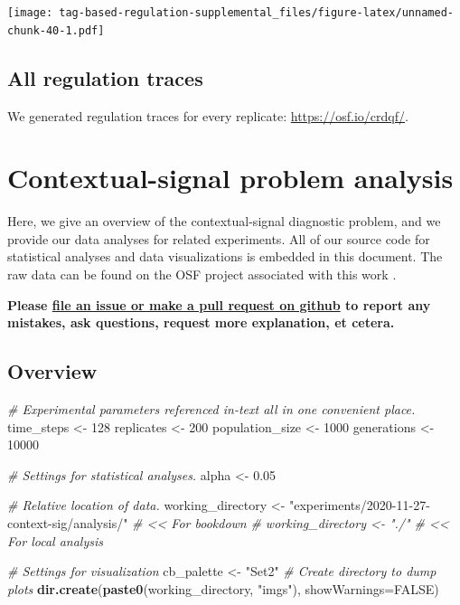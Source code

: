 \documentclass[]{book}
\newenvironment{Shaded}{\begin{snugshade}}{\end{snugshade}}
\newcommand{\CommentTok}[1]{\textcolor[rgb]{0.56,0.35,0.01}{\textit{#1}}}
\newcommand{\DataTypeTok}[1]{\textcolor[rgb]{0.13,0.29,0.53}{#1}}
\newcommand{\DecValTok}[1]{\textcolor[rgb]{0.00,0.00,0.81}{#1}}
\newcommand{\FloatTok}[1]{\textcolor[rgb]{0.00,0.00,0.81}{#1}}
\newcommand{\KeywordTok}[1]{\textcolor[rgb]{0.13,0.29,0.53}{\textbf{#1}}}
\newcommand{\NormalTok}[1]{#1}
\newcommand{\OtherTok}[1]{\textcolor[rgb]{0.56,0.35,0.01}{#1}}
\newcommand{\StringTok}[1]{\textcolor[rgb]{0.31,0.60,0.02}{#1}}
\begin{document}
\texttt{[image: tag-based-regulation-supplemental\_files/figure-latex/unnamed-chunk-40-1.pdf]}

\hypertarget{all-regulation-traces}{%
\section{All regulation traces}\label{all-regulation-traces}}

We generated regulation traces for every replicate: \url{https://osf.io/crdqf/}.

\hypertarget{contextual-signal-problem-analysis}{%
\chapter{Contextual-signal problem analysis}\label{contextual-signal-problem-analysis}}

Here, we give an overview of the contextual-signal diagnostic problem, and we provide our data analyses for related experiments.
All of our source code for statistical analyses and data visualizations is embedded in this document.
The raw data can be found on the OSF project associated with this work \citep{Lalejini_Moreno_Ofria_Data_2020}.

\textbf{Please \href{https://github.com/amlalejini/Tag-based-Genetic-Regulation-for-LinearGP/issues}{file an issue or make a pull request on github} to report any mistakes, ask questions, request more explanation, et cetera.}

\hypertarget{overview-1}{%
\section{Overview}\label{overview-1}}

\begin{Shaded}
\begin{Highlighting}[]
\CommentTok{# Experimental parameters referenced in-text all in one convenient place.}
\NormalTok{time_steps <-}\StringTok{ }\DecValTok{128}
\NormalTok{replicates <-}\StringTok{ }\DecValTok{200}
\NormalTok{population_size <-}\StringTok{ }\DecValTok{1000}
\NormalTok{generations <-}\StringTok{ }\DecValTok{10000}

\CommentTok{# Settings for statistical analyses.}
\NormalTok{alpha <-}\StringTok{ }\FloatTok{0.05}

\CommentTok{# Relative location of data.}
\NormalTok{working_directory <-}\StringTok{ "experiments/2020-11-27-context-sig/analysis/"} \CommentTok{# << For bookdown}
\CommentTok{# working_directory <- "./"                                         # << For local analysis}

\CommentTok{# Settings for visualization}
\NormalTok{cb_palette <-}\StringTok{ "Set2"}
\CommentTok{# Create directory to dump plots}
\KeywordTok{dir.create}\NormalTok{(}\KeywordTok{paste0}\NormalTok{(working_directory, }\StringTok{"imgs"}\NormalTok{), }\DataTypeTok{showWarnings=}\OtherTok{FALSE}\NormalTok{)}
\end{Highlighting}
\end{Shaded}
\end{document}
